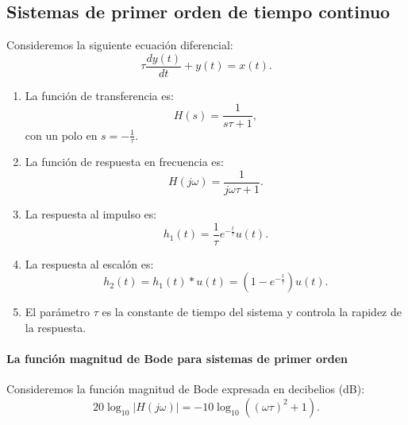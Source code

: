 \documentclass[11pt,a4paper,openany]{book}
\begin{document}
\subsection{Sistemas de primer orden de tiempo continuo}

Consideremos la siguiente ecuaci\'{o}n diferencial:
\begin{equation}
	\tau \frac{dy(t)}{dt} + y(t) = x(t).
\end{equation}

\begin{enumerate}
	\item La funci\'{o}n de transferencia es:
	\begin{equation}
		H(s) = \frac{1}{s\tau + 1},
	\end{equation}
	con un polo en $s = -\frac{1}{\tau}$.
	
	\item La funci\'{o}n de respuesta en frecuencia es:
	\begin{equation}
		H(j\omega) = \frac{1}{j\omega \tau + 1}.
	\end{equation}
	
	\item La respuesta al impulso es:
	\begin{equation}
		h_{1}(t) = \frac{1}{\tau} e^{-\frac{t}{\tau}} u(t).
	\end{equation}
	
	\item La respuesta al escal\'{o}n es:
	\begin{equation}
		h_{2}(t) = h_{1}(t) * u(t) = \left(1 - e^{-\frac{t}{\tau}}\right) u(t).
	\end{equation}
	
	\item El par\'{a}metro $\tau$ es la constante de tiempo del sistema y controla la rapidez de la respuesta.
\end{enumerate}

\paragraph{La funci\'{o}n magnitud de Bode para sistemas de primer orden}
Consideremos la funci\'{o}n magnitud de Bode expresada en decibelios (dB):
\begin{equation}
	20\log_{10} |H(j\omega)| = -10\log_{10}\left((\omega\tau)^{2} + 1\right). \label{magbode}
\end{equation}
\end{document}

